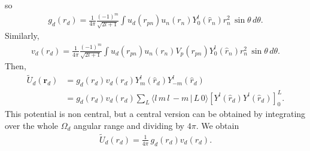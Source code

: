 \documentclass[a4paper,11pt]{article}
\begin{document}
so
  \begin{align}\label{eq93}
  g_d(r_d)=\frac{1}{4\pi}\frac{(-1)^m}{\sqrt{2l+1}}\int u_d(r_{pn})u_n(r_n)Y^l_{0}(\hat r_n)r_n^2\,\sin\theta\,d\theta.
  \end{align}
Similarly,
  \begin{align}\label{eq94}
  v_d(r_d)=\frac{1}{4\pi}\frac{(-1)^m}{\sqrt{2l+1}}\int u_d(r_{pn})u_n(r_n)V_p(r_{pn})Y^l_{0}(\hat r_n)r_n^2\,\sin\theta\,d\theta.
  \end{align}
Then,
  \begin{align}\label{eq96}
 \nonumber  \widetilde U_d(\mathbf r_d)&=g_d(r_d)v_d(r_d) Y^l_m(\hat r_d)Y^l_{-m}(\hat r_d)\\
 &=g_d(r_d)v_d(r_d)\sum_L \langle l\,m\,l\,-m\,|\,L\,0\rangle\left[Y^l(\hat r_d)Y^l(\hat r_d)\right]^L_0.
  \end{align}
This potential is non central, but a central version can be obtained by integrating over the whole $\Omega_d$ angular range and dividing by $4\pi$. We obtain
  \begin{align}\label{eq97}
   \widetilde U_d(r_d)=\frac{1}{4\pi}\,g_d(r_d)v_d(r_d).
  \end{align}
\end{document}
